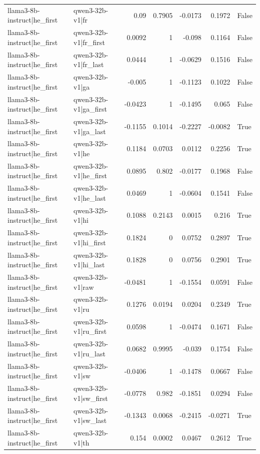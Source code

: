 \begin{table}
\begin{tabular}{l l r r r r l}
llama3-8b-instruct|he_first & qwen3-32b-v1|fr & 0.09 & 0.7905 & -0.0173 & 0.1972 & False \\
llama3-8b-instruct|he_first & qwen3-32b-v1|fr_first & 0.0092 & 1 & -0.098 & 0.1164 & False \\
llama3-8b-instruct|he_first & qwen3-32b-v1|fr_last & 0.0444 & 1 & -0.0629 & 0.1516 & False \\
llama3-8b-instruct|he_first & qwen3-32b-v1|ga & -0.005 & 1 & -0.1123 & 0.1022 & False \\
llama3-8b-instruct|he_first & qwen3-32b-v1|ga_first & -0.0423 & 1 & -0.1495 & 0.065 & False \\
llama3-8b-instruct|he_first & qwen3-32b-v1|ga_last & -0.1155 & 0.1014 & -0.2227 & -0.0082 & True \\
llama3-8b-instruct|he_first & qwen3-32b-v1|he & 0.1184 & 0.0703 & 0.0112 & 0.2256 & True \\
llama3-8b-instruct|he_first & qwen3-32b-v1|he_first & 0.0895 & 0.802 & -0.0177 & 0.1968 & False \\
llama3-8b-instruct|he_first & qwen3-32b-v1|he_last & 0.0469 & 1 & -0.0604 & 0.1541 & False \\
llama3-8b-instruct|he_first & qwen3-32b-v1|hi & 0.1088 & 0.2143 & 0.0015 & 0.216 & True \\
llama3-8b-instruct|he_first & qwen3-32b-v1|hi_first & 0.1824 & 0 & 0.0752 & 0.2897 & True \\
llama3-8b-instruct|he_first & qwen3-32b-v1|hi_last & 0.1828 & 0 & 0.0756 & 0.2901 & True \\
llama3-8b-instruct|he_first & qwen3-32b-v1|raw & -0.0481 & 1 & -0.1554 & 0.0591 & False \\
llama3-8b-instruct|he_first & qwen3-32b-v1|ru & 0.1276 & 0.0194 & 0.0204 & 0.2349 & True \\
llama3-8b-instruct|he_first & qwen3-32b-v1|ru_first & 0.0598 & 1 & -0.0474 & 0.1671 & False \\
llama3-8b-instruct|he_first & qwen3-32b-v1|ru_last & 0.0682 & 0.9995 & -0.039 & 0.1754 & False \\
llama3-8b-instruct|he_first & qwen3-32b-v1|sw & -0.0406 & 1 & -0.1478 & 0.0667 & False \\
llama3-8b-instruct|he_first & qwen3-32b-v1|sw_first & -0.0778 & 0.982 & -0.1851 & 0.0294 & False \\
llama3-8b-instruct|he_first & qwen3-32b-v1|sw_last & -0.1343 & 0.0068 & -0.2415 & -0.0271 & True \\
llama3-8b-instruct|he_first & qwen3-32b-v1|th & 0.154 & 0.0002 & 0.0467 & 0.2612 & True \\

\end{tabular}
\end{table}
